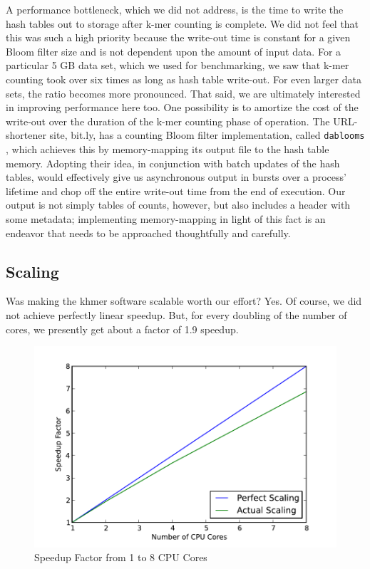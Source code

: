 \documentclass{article}
\begin{document}
A performance bottleneck, which we did not address, is the time to write the
hash tables out to storage after k-mer counting is complete. We did not feel
that this was such a high priority because the write-out time is constant for a
given Bloom filter size and is not dependent upon the amount of input data.
For a particular 5 GB data set, which we used for benchmarking, we saw that
k-mer counting took over six times as long as hash table write-out. For even
larger data sets, the ratio becomes more pronounced. That said, we are
ultimately interested in improving performance here too. One possibility is to
amortize the cost of the write-out over the duration of the k-mer counting
phase of operation. The URL-shortener site, bit.ly, has a counting Bloom filter
implementation, called \texttt{dablooms} \cite{web:dablooms}, which achieves
this by memory-mapping its output file to the hash table memory. Adopting their
idea, in conjunction with batch updates of the hash tables, would effectively
give us asynchronous output in bursts over a process' lifetime and chop off the
entire write-out time from the end of execution. Our output is not simply
tables of counts, however, but also includes a header with some metadata;
implementing memory-mapping in light of this fact is an endeavor that needs to
be approached thoughtfully and carefully.

\subsection{Scaling}

Was making the khmer software scalable worth our effort? Yes. Of course, we did
not achieve perfectly linear speedup. But, for every doubling of the number of
cores, we presently get about a factor of 1.9 speedup.

\begin{figure}[ht!]
\centering
\includegraphics[scale=0.75]{scaling.pdf}
\caption{Speedup Factor from 1 to 8 CPU Cores}
\label{khmerScaling}
\end{figure}
\end{document}
